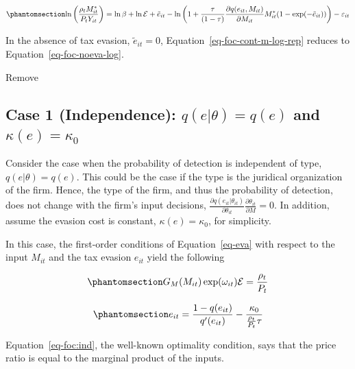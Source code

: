 \documentclass[
  12pt]{article}
\theoremstyle{definition}
\theoremstyle{remark}
\begin{document}
\begin{equation}\phantomsection\label{eq-foc-cont-m-log-rep}{
\ln\left(\frac{\rho_tM^*_{it}}{P_tY_{it}}\right)=\ln\beta+\ln\mathcal{E}+\tilde{e}_{it}-\ln\left(1+\frac{\tau}{(1-\tau)}\frac{\partial q(e_{it},M_{it})}{\partial M_{it}}M^*_{it}(1-\exp(-\tilde{e}_{it}))\right)-\varepsilon_{it} 
}\end{equation}

In the absence of tax evasion, \(\tilde{e}_{it}=0\),
Equation~\ref{eq-foc-cont-m-log-rep} reduces to
Equation~\ref{eq-foc-noeva-log}.

\begin{anfxnote}{Remove}

\subsection{\texorpdfstring{Case 1 (Independence): \(q(e|\theta)=q(e)\)
and
\(\kappa(e)=\kappa_0\)}{Case 1 (Independence): q(e\textbar\textbackslash theta)=q(e) and \textbackslash kappa(e)=\textbackslash kappa\_0}}\label{case-1-independence-qethetaqe-and-kappaekappa_0}

Consider the case when the probability of detection is independent of
type, \(q(e|\theta)=q(e)\). This could be the case if the type is the
juridical organization of the firm. Hence, the type of the firm, and
thus the probability of detection, does not change with the firm's input
decisions,
\(\frac{\partial q(e_{it}|\theta_{it})}{\partial \theta_{it}}\frac{\partial \theta_{it}}{\partial M}=0\).
In addition, assume the evasion cost is constant,
\(\kappa(e)=\kappa_0\), for simplicity.

In this case, the first-order conditions of Equation~\ref{eq-eva} with
respect to the input \(M_{it}\) and the tax evasion \(e_{it}\) yield the
following

\begin{equation}\phantomsection\label{eq-foc:ind}{
G_M(M_{it})\exp(\omega_{it})\mathcal{E}=\frac{\rho_{t}}{P_t}
}\end{equation}

\begin{equation}\phantomsection\label{eq-foc:eva:ind}{
e_{it}=\frac{1-q(e_{it})}{q'(e_{it})}-\frac{\kappa_0}{\frac{\rho_{t}}{P_t}\tau}
}\end{equation}

Equation~\ref{eq-foc:ind}, the well-known optimality condition, says
that the price ratio is equal to the marginal product of the inputs.


\end{anfxnote}
\end{document}
